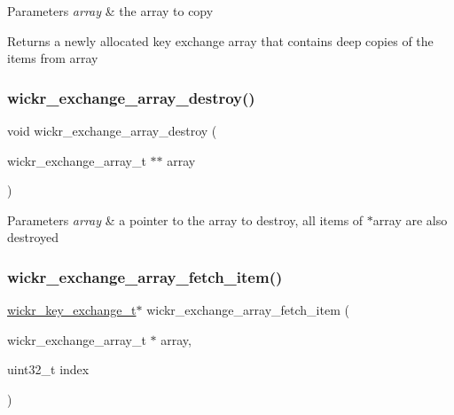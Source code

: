 \begin{DoxyParams}{Parameters}
{\em array} & the array to copy \\
\hline
\end{DoxyParams}
\begin{DoxyReturn}{Returns}
a newly allocated key exchange array that contains deep copies of the items from \textquotesingle{}array\textquotesingle{} 
\end{DoxyReturn}
\mbox{\label{group__wickr__protocol_gadc1e5f5836bc09c1d6b8d6203d02a0eb}} 
\subsubsection{\texorpdfstring{wickr\+\_\+exchange\+\_\+array\+\_\+destroy()}{wickr\_exchange\_array\_destroy()}}
{\footnotesize\ttfamily void wickr\+\_\+exchange\+\_\+array\+\_\+destroy (\begin{DoxyParamCaption}\item[{wickr\+\_\+exchange\+\_\+array\+\_\+t $\ast$$\ast$}]{array }\end{DoxyParamCaption})}


\begin{DoxyParams}{Parameters}
{\em array} & a pointer to the array to destroy, all items of \textquotesingle{}$\ast$array\textquotesingle{} are also destroyed \\
\hline
\end{DoxyParams}
\mbox{\label{group__wickr__protocol_ga333510c3c7eeb8e33f94495de6bb122d}} 
\subsubsection{\texorpdfstring{wickr\+\_\+exchange\+\_\+array\+\_\+fetch\+\_\+item()}{wickr\_exchange\_array\_fetch\_item()}}
{\footnotesize\ttfamily \hyperlink{structwickr__key__exchange}{wickr\+\_\+key\+\_\+exchange\+\_\+t}$\ast$ wickr\+\_\+exchange\+\_\+array\+\_\+fetch\+\_\+item (\begin{DoxyParamCaption}\item[{wickr\+\_\+exchange\+\_\+array\+\_\+t $\ast$}]{array,  }\item[{uint32\+\_\+t}]{index }\end{DoxyParamCaption})}

